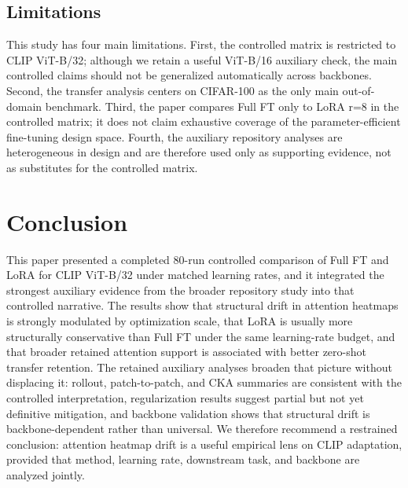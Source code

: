 \documentclass[10pt]{article}
\begin{document}
\subsection{Limitations}
This study has four main limitations. First, the controlled matrix is restricted to CLIP ViT-B/32; although we retain a useful ViT-B/16 auxiliary check, the main controlled claims should not be generalized automatically across backbones. Second, the transfer analysis centers on CIFAR-100 as the only main out-of-domain benchmark. Third, the paper compares Full FT only to LoRA r=8 in the controlled matrix; it does not claim exhaustive coverage of the parameter-efficient fine-tuning design space. Fourth, the auxiliary repository analyses are heterogeneous in design and are therefore used only as supporting evidence, not as substitutes for the controlled matrix.

\section{Conclusion}
This paper presented a completed 80-run controlled comparison of Full FT and LoRA for CLIP ViT-B/32 under matched learning rates, and it integrated the strongest auxiliary evidence from the broader repository study into that controlled narrative. The results show that structural drift in attention heatmaps is strongly modulated by optimization scale, that LoRA is usually more structurally conservative than Full FT under the same learning-rate budget, and that broader retained attention support is associated with better zero-shot transfer retention. The retained auxiliary analyses broaden that picture without displacing it: rollout, patch-to-patch, and CKA summaries are consistent with the controlled interpretation, regularization results suggest partial but not yet definitive mitigation, and backbone validation shows that structural drift is backbone-dependent rather than universal. We therefore recommend a restrained conclusion: attention heatmap drift is a useful empirical lens on CLIP adaptation, provided that method, learning rate, downstream task, and backbone are analyzed jointly.



\end{document}
